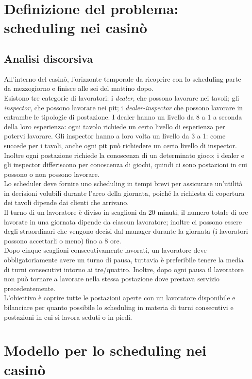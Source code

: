\section{Definizione del problema: scheduling nei casinò}
\subsection{Analisi discorsiva}
All'interno del casinò, l'orizzonte temporale da ricoprire con lo scheduling parte da mezzogiorno e finisce alle sei del mattino dopo. \\Esistono tre categorie di lavoratori: i \textit{dealer}, che possono lavorare nei tavoli; gli \textit{inspector}, che possono lavorare nei pit; i \textit{dealer-inspector} che possono lavorare in entrambe le tipologie di postazione. I dealer hanno un livello da 8 a 1 a seconda della loro esperienza: ogni tavolo richiede un certo livello di esperienza per potervi lavorare. Gli inspector hanno a loro volta un livello da 3 a 1: come succede per i tavoli, anche ogni pit può richiedere un certo livello di inspector.
Inoltre ogni postazione richiede la conoscenza di un determinato gioco; i dealer e gli inspector differiscono per conoscenza di giochi, quindi ci sono postazioni in cui possono o non possono lavorare.\\
Lo scheduler deve fornire uno scheduling in tempi brevi per assicurare un'utilità in decisioni volubili durante l'arco della giornata, poiché la richiesta di copertura dei tavoli dipende dai clienti che arrivano. \\Il turno di un lavoratore è diviso in scaglioni da 20 minuti, il numero totale di ore lavorate in una giornata dipende da ciascun lavoratore; inoltre ci possono essere degli straordinari che vengono decisi dal manager durante la giornata (i lavoratori possono accettarli o meno) fino a 8 ore.\\
Dopo cinque scaglioni consecutivamente lavorati, un lavoratore deve obbligatoriamente avere un turno di pausa, tuttavia è preferibile tenere la media di turni consecutivi intorno ai tre/quattro. Inoltre, dopo ogni pausa il lavoratore non può tornare a lavorare nella stessa postazione dove prestava servizio precedentemente.\\ L'obiettivo è coprire tutte le postazioni aperte con un lavoratore disponibile e bilanciare per quanto possibile lo scheduling in materia di turni consecutivi e postazioni in cui si lavora seduti o in piedi.

\section{Modello per lo scheduling nei casinò}

